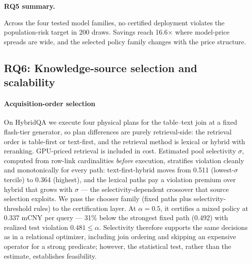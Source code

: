 \smallskip\noindent\textbf{RQ5 summary.}\par
Across the four tested model families, no certified deployment violates
the population-risk target in 200 draws. Savings reach 16.6$\times$
where model-price spreads are wide, and the selected policy family
changes with the price structure.

\subsection{RQ6: Knowledge-source selection and scalability}
\label{sec:exp-scale}

\paragraph{Acquisition-order selection}
On HybridQA we execute four physical plans for the table--text join at
a fixed flash-tier generator, so plan differences are purely
retrieval-side: the retrieval order is table-first or text-first, and
the retrieval method is lexical or hybrid with reranking. GPU-priced
retrieval is included in cost. Estimated
pool selectivity $\sigma$, computed from row-link cardinalities
\emph{before} execution, stratifies violation cleanly and monotonically
for every path: text-first-hybrid moves from 0.511 (lowest-$\sigma$
tercile) to 0.364 (highest), and the lexical paths pay a violation
premium over hybrid that grows with $\sigma$ --- the
selectivity-dependent crossover that source selection exploits. We
pass the chooser family (fixed paths plus selectivity-threshold rules)
to the certification layer. At $\alpha = 0.5$, it certifies a mixed policy at
0.337 mCNY per query --- 31\% below the strongest fixed path (0.492)
with realized test violation $0.481 \le \alpha$. Selectivity therefore
supports the same decisions as in a relational optimizer, including join
ordering and skipping an expensive operator for a strong predicate;
however, the statistical test, rather than the estimate, establishes
feasibility.

